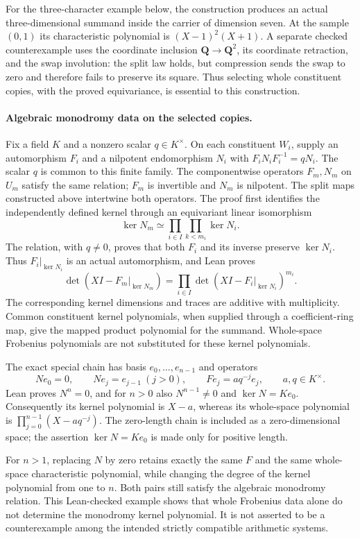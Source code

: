 \documentclass[11pt]{article}
\theoremstyle{definition}
\theoremstyle{remark}
\begin{document}
For the three-character example below, the construction produces an actual
three-dimensional summand inside the carrier of dimension seven. At the sample
$(0,1)$ its characteristic polynomial is $(X-1)^2(X+1)$. A separate checked
counterexample uses the coordinate inclusion $\mathbf Q\to\mathbf Q^2$, its
coordinate retraction, and the swap involution: the split law holds, but
compression sends the swap to zero and therefore fails to preserve its square.
Thus selecting whole constituent copies, with the proved equivariance, is
essential to this construction.

\paragraph{Algebraic monodromy data on the selected copies.}
Fix a field $K$ and a nonzero scalar $q\in K^\times$. On each constituent
$W_i$, supply an automorphism $F_i$ and a nilpotent endomorphism $N_i$ with
$F_iN_iF_i^{-1}=qN_i$. The scalar $q$ is common to this finite family.
The componentwise operators $F_m,N_m$ on $U_m$ satisfy the same relation;
$F_m$ is invertible and $N_m$ is nilpotent. The split maps constructed above
intertwine both operators. The proof first identifies the independently defined
kernel through an equivariant linear isomorphism
\[
 \ker N_m\simeq\prod_{i\in I}\prod_{k<m_i}\ker N_i.
\]
The relation, with $q\ne0$, proves that both $F_i$ and its inverse preserve
$\ker N_i$. Thus $F_i|_{\ker N_i}$ is an actual automorphism, and Lean proves
\[
 \det(XI-F_m|_{\ker N_m})
   =\prod_{i\in I}\det(XI-F_i|_{\ker N_i})^{m_i}.
\]
The corresponding kernel dimensions and traces are additive with multiplicity.
Common constituent kernel polynomials, when supplied through a coefficient-ring
map, give the mapped product polynomial for the summand. Whole-space Frobenius
polynomials are not substituted for these kernel polynomials.

The exact special chain has basis $e_0,\ldots,e_{n-1}$ and operators
\[
 Ne_0=0,\qquad Ne_j=e_{j-1}\ (j>0),\qquad Fe_j=aq^{-j}e_j,
 \qquad a,q\in K^\times.
\]
Lean proves $N^n=0$, and for $n>0$ also $N^{n-1}\ne0$ and
$\ker N=Ke_0$. Consequently its kernel polynomial is $X-a$, whereas its
whole-space polynomial is $\prod_{j=0}^{n-1}(X-aq^{-j})$.
The zero-length chain is included as a zero-dimensional space; the assertion
$\ker N=Ke_0$ is made only for positive length.

For $n>1$, replacing $N$ by zero retains exactly the same $F$ and the same
whole-space characteristic polynomial, while changing the degree of the kernel
polynomial from one to $n$. Both pairs still satisfy the algebraic monodromy
relation. This Lean-checked example shows that whole Frobenius data alone do
not determine the monodromy kernel polynomial. It is not asserted to be a
counterexample among the intended strictly compatible arithmetic systems.
\end{document}

